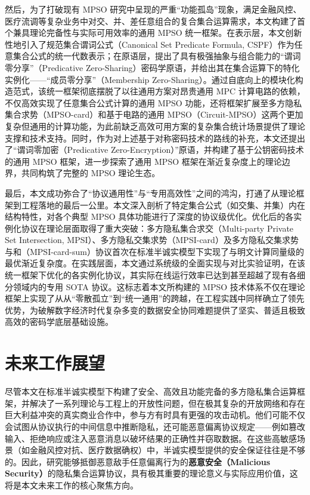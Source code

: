 然后，为了打破现有 MPSO 研究中呈现的严重“功能孤岛”现象，满足金融风控、医疗流调等复杂业务中对交、并、差任意组合的复合集合运算需求，本文构建了首个兼具理论完备性与实际可用效率的通用 MPSO 统一框架。在表示层，本文创新性地引入了规范集合谓词公式（Canonical Set Predicate Formula, CSPF）作为任意集合公式的统一代数表示；在原语层，提出了具有极强抽象与组合能力的“谓词零分享”（Predicative Zero-Sharing）密码学原语，并给出其在集合运算下的特化实例化——“成员零分享”（Membership Zero-Sharing）。通过自底向上的模块化构造范式，该统一框架彻底摆脱了以往通用方案对昂贵通用 MPC 计算电路的依赖，不仅高效实现了任意集合公式计算的通用 MPSO 功能，还将框架扩展至多方隐私集合求势（MPSO-card）和基于电路的通用 MPSO（Circuit-MPSO）这两个更加复杂但通用的计算功能，为此前缺乏高效可用方案的复杂集合统计场景提供了理论支撑和技术支持。同时，作为对上述基于对称密码技术的路线的补充，本文还提出了“谓词零加密（Predicative Zero-Encryption）”原语，并构建了基于公钥密码技术的通用 MPSO 框架，进一步探索了通用 MPSO 框架在渐近复杂度上的理论边界，共同构筑了完整的 MPSO 理论生态。

最后，本文成功弥合了“协议通用性”与“专用高效性”之间的鸿沟，打通了从理论框架到工程落地的最后一公里。本文深入剖析了特定集合公式（如交集、并集）内在结构特性，对各个典型 MPSO 具体功能进行了深度的协议级优化。优化后的各实例化协议在理论层面取得了重大突破：多方隐私集合求交（Multi-party Private Set Intersection, MPSI）、多方隐私交集求势（MPSI-card）及多方隐私交集求势与和（MPSI-card-sum）协议首次在标准半诚实模型下实现了与明文计算同量级的最优渐近复杂度。在实践层面，本文通过系统级的全面实现与对比实验证明，在该统一框架下优化的各实例化协议，其实际在线运行效率已达到甚至超越了现有各细分领域内的专用 SOTA 协议。这标志着本文所构建的 MPSO 技术体系不仅在理论框架上实现了从从“零散孤立”到“统一通用”的跨越，在工程实践中同样确立了领先优势，为破解数字经济时代复杂多变的数据安全协同难题提供了坚实、普适且极致高效的密码学底层基础设施。

\section{未来工作展望}

尽管本文在标准半诚实模型下构建了安全、高效且功能完备的多方隐私集合运算框架，并解决了一系列理论与工程上的开放性问题，但在极其复杂的开放网络和存在巨大利益冲突的真实商业合作中，参与方有时具有更强的攻击动机。他们可能不仅会试图从协议执行的中间信息中推断隐私，还可能恶意偏离协议规定——例如篡改输入、拒绝响应或注入恶意消息以破坏结果的正确性并窃取数据。在这些高敏感场景（如金融风控对抗、医疗数据确权）中，半诚实模型提供的安全保证往往是不够的。因此，研究能够抵御恶意敌手任意偏离行为的\textbf{恶意安全（Malicious Security）}的隐私集合运算协议，具有极其重要的理论意义与实际应用价值，这将是本文未来工作的核心聚焦方向。

